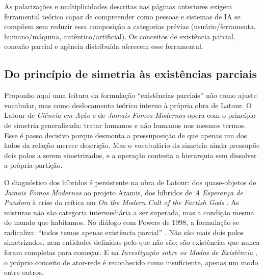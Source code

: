 As polarizações e multiplicidades descritas nas páginas anteriores exigem ferramental teórico capaz de compreender como pessoas e sistemas de IA se compõem sem reduzir essa composição a categorias prévias (usuário/ferramenta, humano/máquina, autêntico/artificial). Os conceitos de existência parcial, conexão parcial e agência distribuída oferecem esse ferramental.

\subsection*{Do princípio de simetria às existências parciais}

Proponho aqui uma leitura da formulação ``existências parciais'' não como ajuste vocabular, mas como deslocamento teórico interno à própria obra de Latour. O Latour de \textit{Ciência em Ação} \parencite*{Latour2011CienciaEmAcao} e de \textit{Jamais Fomos Modernos} \parencite*{Latour1994Jamais} opera com o princípio de simetria generalizada: tratar humanos e não humanos nos mesmos termos. Esse é passo decisivo porque desmonta a pressuposição de que apenas um dos lados da relação merece descrição. Mas o vocabulário da simetria ainda pressupõe dois polos a serem simetrizados, e a operação contesta a hierarquia sem dissolver a própria partição.

O diagnóstico dos híbridos é persistente na obra de Latour: dos quase-objetos de \textit{Jamais Fomos Modernos} ao projeto Aramis, dos híbridos de \textit{A Esperança de Pandora} \parencite*{Latour2017Esperanca} à crise da crítica em \textit{On the Modern Cult of the Factish Gods} \parencite*{latour2010factish}. As misturas não são categoria intermediária a ser superada, mas a condição mesma do mundo que habitamos. No diálogo com Powers de 1998, a formulação se radicaliza: ``todos temos apenas existência parcial'' \parencite{Latour2008Powers}. Não são mais dois polos simetrizados, nem entidades definidas pelo que não são; são existências que nunca foram completas para começar. E na \textit{Investigação sobre os Modos de Existência} \parencite*{latour2019investigacao}, o próprio conceito de ator-rede é reconhecido como insuficiente, apenas um modo entre outros.

